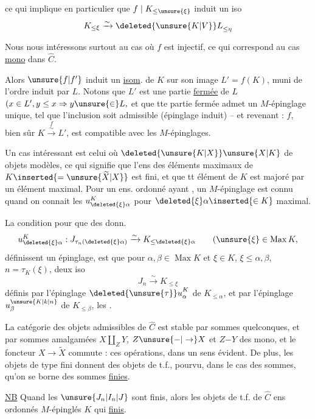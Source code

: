 ce qui implique en particulier que $f\mid K_{\leq\unsure{\xi}}$ induit un iso
\[
K_{\leq\xi}\xrightarrow{\sim}{\deleted{\unsure{K|V}}L}_{\leq\eta}
\]

Nous nous intéressons surtout au cas où $f$ est injectif, ce qui correspond au  cas  \uline{mono} dans $\widehat C$.

Alors $\unsure{f|f'}$ induit un \uline{isom}. de $K$ sur   son image $L'=f(K)$, muni de l'ordre induit par $L$. Notons que $L'$ est une partie \uline{fermée} de $L$ $(x\in L',y\leq x\Rightarrow y\unsure{\in}L,$ et que tte partie fermée admet un $M$-épinglage  unique, tel que l'inclusion soit admissible (épinglage induit) -- et revenant : $f$, bien sûr $K\overset{f}{\xrightarrow{\sim}}L'$, est compatible avec les $M$-épinglages.

Un cas intéressant est celui où $\deleted{\unsure{K|X}}\unsure{X|K}$   de  objets modèles, ce qui signifie que l'ens des éléments maximaux de $K\inserted{=\unsure{\widetilde X|X}}$ est fini, et que tt élément de $K$ est majoré par un élément maximal. Pour un ens. ordonné ayant   , un $M$-épinglage est connu quand on connait les $u^K_{\deleted{\xi}\alpha}$ pour $\deleted{\xi}\alpha\inserted{\in K}$\unsure{(|,} maximal.

La condition pour que des donn.
\[
u^K_{\deleted{\xi}\alpha}: J_{\tau_n(\deleted{\xi}\alpha)}
   \xrightarrow{\sim} K_{\leq\deleted{\xi}\alpha}\qquad
   (\unsure{\xi}\in\operatorname{Max}K,
\]
définissent un épinglage, est que pour  $\alpha,\beta\in\operatorname{Max}K$ et $\xi\in K$, $\xi\leq\alpha,\beta$,  $n=\tau_K(\xi)$,  deux iso
\[
J_n\xrightarrow{\sim}K_{\leq\xi}
\]
définis par l'épinglage  ${\deleted{\unsure{\tau}}u}^K_\alpha$ de $K_{\leq\alpha}$, et par l'épinglage $u^{\unsure{K|k|n}}_\beta$ de $K_{\leq\beta}$,  les .

La catégorie des objets admissibles de $\widehat C$ est stable par  sommes quelconques, et par sommes amalgamées $X\amalg_Z Y$,  $Z\unsure{\mathord{-}|\to}X$ et $Z\mathord{-}Y$ des mono, et le foncteur $X\to\widetilde X$ commute : ces opérations, dans un sens évident. De plus, les objets de type fini donnent des objets de t.f., pourvu, \unsure{(}dans le cas des sommes\unsure{)|,}, qu'on se borne  des sommes \uline{finies}.

\uline{NB} Quand les $\unsure{J_n|I_n|J}$ sont finis, alors les objets  de t.f. de $\widehat C$   ens ordonnés $M$-épinglés $K$ qui  \uline{finis}.
